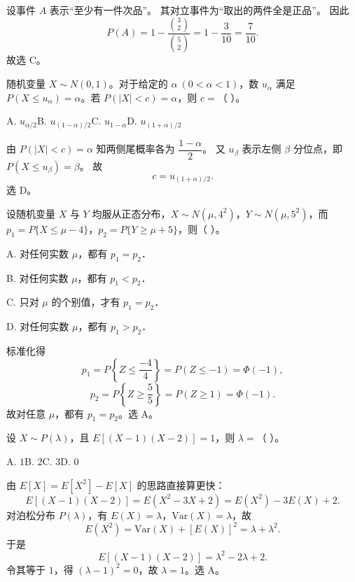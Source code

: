 \documentclass[lang=cn,11pt]{elegantbook}
\begin{document}
\begin{solution}
\par
设事件 \(A\) 表示“至少有一件次品”。
其对立事件为“取出的两件全是正品”。
因此
\[
  P(A)=1-\frac{\binom32}{\binom52}=1-\frac{3}{10}=\frac{7}{10}.
\]
故选 C。
\end{solution}
\begin{exercise}
\par
随机变量 \(X\sim N(0,1)\)。对于给定的 \(\alpha\ (0<\alpha<1)\)，数 \(u_\alpha\) 满足 \(P(X\le u_\alpha)=\alpha\)。若 \(P(|X|<c)=\alpha\)，则 \(c=\)（ ）。

A. \(u_{\alpha/2}\)\qquad B. \(u_{(1-\alpha)/2}\)\qquad C. \(u_{1-\alpha}\)\qquad D. \(u_{(1+\alpha)/2}\)
\end{exercise}

\begin{solution}
\par
由 \(P(|X|<c)=\alpha\) 知两侧尾概率各为 \(\dfrac{1-\alpha}{2}\)。
又 \(u_\beta\) 表示左侧 \(\beta\) 分位点，即 \(P(X\le u_\beta)=\beta\)。
故
\[
  c=u_{(1+\alpha)/2}.
\]
选 D。
\end{solution}
\begin{exercise}
\par
设随机变量 \(X\) 与 \(Y\) 均服从正态分布，\(X\sim N(\mu,4^2)\)，\(Y\sim N(\mu,5^2)\)，而 \(p_1=P\{X\le \mu-4\}\)，\(p_2=P\{Y\ge \mu+5\}\)，则（ ）。

A. 对任何实数 \(\mu\)，都有 \(p_1=p_2\)．

B. 对任何实数 \(\mu\)，都有 \(p_1<p_2\)．

C. 只对 \(\mu\) 的个别值，才有 \(p_1=p_2\)．

D. 对任何实数 \(\mu\)，都有 \(p_1>p_2\)．
\end{exercise}

\begin{solution}
\par
标准化得
\[
  p_1=P\!\left\{Z\le \frac{-4}{4}\right\}=P(Z\le -1)=\Phi(-1),
\]
\[
  p_2=P\!\left\{Z\ge \frac{5}{5}\right\}=P(Z\ge 1)=\Phi(-1).
\]
故对任意 \(\mu\)，都有 \(p_1=p_2\)。选 A。
\end{solution}
\begin{exercise}
\par
设 \(X\sim P(\lambda)\)，且 \(E[(X-1)(X-2)]=1\)，则 \(\lambda=\)（ ）。

A. \(1\)\qquad B. \(2\)\qquad C. \(3\)\qquad D. \(0\)
\end{exercise}

\begin{solution}
\par
由 \(E[X]=E[X^2]-E[X]\) 的思路直接算更快：
\[
  E[(X-1)(X-2)]
  =E(X^2-3X+2)
  =E(X^2)-3E(X)+2.
\]
对泊松分布 \(P(\lambda)\)，有 \(E(X)=\lambda\)，\(\mathrm{Var}(X)=\lambda\)，故
\[
  E(X^2)=\mathrm{Var}(X)+[E(X)]^2=\lambda+\lambda^2.
\]
于是
\[
  E[(X-1)(X-2)]=\lambda^2-2\lambda+2.
\]
令其等于 \(1\)，得 \((\lambda-1)^2=0\)，故 \(\lambda=1\)。选 A。
\end{solution}
\end{document}

